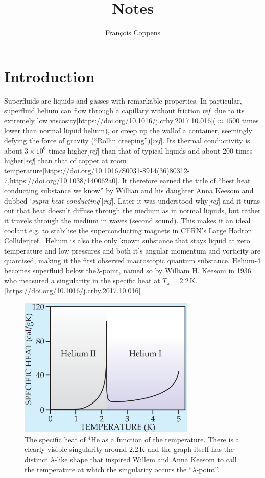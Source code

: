 \documentclass[12pt,a4paper]{book}
\author{Fran\c{c}ois Coppens}
\title{Notes}
\newcommand{\unit}[1]{\,\mathrm{#1}}
\begin{document}
\tableofcontents

\chapter{Introduction}
	Superfluids are liquids and gasses with remarkable properties. In particular, superfluid helium can flow through a capillary without friction[\emph{ref}] due to its extremely low viscosity[https://doi.org/10.1016/j.crhy.2017.10.016]($\approx\!1500$ times lower than normal liquid helium), or creep up the wallof a container, seemingly defying the force of gravity (``Rollin creeping'')[\emph{ref}]. Its thermal conductivity is about $3\times10^6$ times higher[\emph{ref}] than that of typical liquids and about 200 times higher[\emph{ref}] than that of copper at room temperature[https://doi.org/10.1016/S0031-8914(36)80312-7,https://doi.org/10.1038/140062a0]. It therefore earned the title of ``best heat conducting substance we know'' by Willian and his daughter Anna Keesom and dubbed `\emph{supra-heat-conducting}'[\emph{ref}]. Later it was understood why[\emph{ref}] and it turns out that heat doesn't diffuse through the medium as in normal liquids, but rather it travels through the medium in waves (second sound). This makes it an ideal coolant e.g. to stabilise the superconducting magnets in CERN's Large Hadron Collider[ref]. Helium is also the only known substance that stays liquid at zero temperature and low pressures and both it's angular momentum and vorticity are quantised, making it the first observed macroscopic quantum substance. Helium-4 becomes superfluid below the$\lambda$-point, named so by William H. Keesom in 1936 who measured a singularity in the specific heat at $T_\lambda=2.2\unit{K}$.[https://doi.org/10.1016/j.crhy.2017.10.016]\\
	
	\begin{figure}[t]
		\begin{center}
			\includegraphics[width=0.75\textwidth]{specific-heat}
		\end{center}
		\caption{The specific heat of $^4$He as a function of the temperature. There is a clearly visible singularity around $2.2\unit{K}$ and the graph itself has the distinct $\lambda$-like shape that inspired Willem and Anna Keesom to call the temperature at which the singularity occurs the ``$\lambda$-point''.}
		\label{fig:specific-heat}
	\end{figure}	
	
\end{document}
